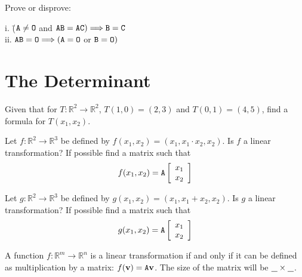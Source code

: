	
\noindent {} Prove or disprove:
 \begin{tabbing}
 	 \indent i. \quad \= ($\texttt{A} \neq \texttt{O}$ and $\texttt{AB} = \texttt{AC}) \Longrightarrow \texttt{B} = \texttt{C}$\\
 	 \indent ii. \> $\texttt{AB} = \texttt{O} \Longrightarrow (\texttt{A}=\texttt{O} $ or $ \texttt{B} = \texttt{O})$
 \end{tabbing}
 
\vspace{.5cm}

\section{The Determinant}    \label{The Determinant}

\begin{myexa}[\bd{a}]
	Given that for $T:\mathbb{R}^2 \rightarrow \mathbb{R}^2$, $T(1,0) = (2,3)$ and $T(0,1) = (4,5)$, find a formula for $T(x_1,x_2)$.
\end{myexa}

\begin{myexb}[\bd{b}]
	Let $f:\mathbb{R}^2 \rightarrow \mathbb{R}^3$ be defined by $f(x_1,x_2) =(x_1, x_1\cdot x_2,x_2)$. Is $f$ a linear transformation? If possible find a matrix   such that \[f(x_1,x_2) = \texttt{A}\left[ \begin{array}{c} x_1 \\ x_2 \end{array} \right] \]
\end{myexb}


\begin{myexc}[\bd{c}]
		Let $g:\mathbb{R}^2 \rightarrow \mathbb{R}^3$ be defined by $g(x_1,x_2) =(x_1, x_1+x_2,x_2)$. Is $g$ a linear transformation? If possible find a matrix   such that \[g(x_1,x_2) = \texttt{A}\left[ \begin{array}{c} x_1 \\ x_2 \end{array} \right]\]
\end{myexc}
\vspace{.5cm}
\begin{theorem}
	A function $f: \mathbb{R}^m \longrightarrow \mathbb{R}^n$ is a linear transformation if and only if it can be defined as multiplication by a matrix: $f(\mathbf{v} ) = \texttt{A}\mathbf{v}$. The size of the matrix will be $\underline{\hspace{.1in} } \times \underline{\hspace{.1in} } $. 
\end{theorem}
\vspace{-.3in}\hspace{5in}\begin{annotation}
\end{annotation}
\vspace{.5cm}

